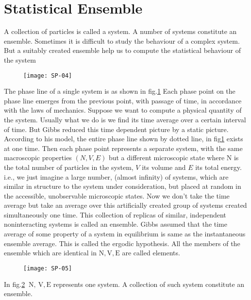\section{Statistical Ensemble}
A collection of particles is called a system. A number of systems constitute an ensemble. Sometimes it is difficult to study the behaviour of a complex system. But a suitably created ensemble help us to compute the statistical behaviour of the system
\begin{figure}[H]
	\centering
	\texttt{[image: SP-04]}
		\caption{}
	\label{SP-01}
\end{figure}
The phase line of a single system is as shown in fig.\ref{SP-01}  Each phase point on the phase line emerges from the previous point, with passage of time, in accordance with the laws of mechanics. Suppose we want to compute a physical quantity of the system. Usually what we do is we find its time average over a certain interval of time. But Gibbs reduced this time dependent picture by a static picture. According to his model, the entire phase line shown by dotted line, in fig\ref{SP-01} exists at one time. Then each phase point represents a separate system, with the same macroscopic properties $(N, V, E)$ but a different microscopic state where $\mathrm{N}$ is the total number of particles in the system, $V$ its volume and $E$ its total energy. i.e., we just imagine a large number, (almost infinity) of systems, which are similar in structure to the system under consideration, but placed at random in the accessible, unobservable microscopic states. Now we don't take the time average but take an average over this artificially created group of systems created simultaneously one time. This collection of replicas of similar, independent noninteracting systems is called an ensemble. Gibbs assumed that the time average of some property of a system in equilibrium is same as the instantaneous ensemble average. This is called the ergodic hypothesis.
All the members of the ensemble which are identical in $\mathrm{N}, \mathrm{V}, \mathrm{E}$ are called elements.
\begin{figure}[H]
	\centering
	\texttt{[image: SP-05]}
	\caption{}
	\label{Ensemble}
\end{figure}
In fig.\ref{Ensemble} $\mathrm{~N}, \mathrm{~V}, \mathrm{E}$ represents one system. A collection of such system constitute an ensemble.

